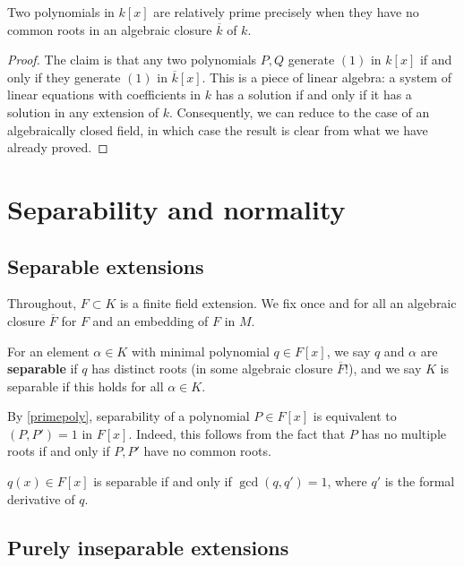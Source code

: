 \begin{proposition} \label{primepoly}
Two polynomials in $k[x]$ are relatively prime precisely when they
have no common roots in an algebraic closure $\overline{k}$ of $k$.
\end{proposition} 
\begin{proof} 
The claim is that any two polynomials $P, Q$ generate $(1)$ in $k[x]$ if and
only if they generate $(1)$ in $\overline{k}[x]$. This is a piece of
linear algebra: a system of linear equations with coefficients in $k$ has
a solution if and only if it has a solution in any extension of $k$.
Consequently, we can reduce to the case of an algebraically closed field, in
which case the result is clear from what we have already proved.
\end{proof} 



\section{Separability and normality}


\subsection{Separable extensions}

Throughout, $F \subset K$ is a finite field extension.  We fix once and for
all an algebraic closure $\overline{F}$ for $F$ and an embedding of $F$ in $M$.


\begin{definition}
For an element $\alpha \in K$ with minimal polynomial $q \in F[x]$, we say
$q$ and $\alpha$ are \textbf{separable} if $q$ has distinct roots (in some
algebraic closure $\overline{F}$!), and we say $K$ is
separable if this holds for all $\alpha \in K$.
\end{definition}



By \cref{primepoly}, separability of a polynomial $P \in F[x]$ is equivalent
to $(P, P') = 1$ in $F[x]$.
Indeed, this follows from the fact that $P$ has no multiple roots if and only if $P, P'$ have no
common roots.

\begin{lemma} $q(x) \in F[x]$ is separable if and only if $\gcd(q, q') = 1$,
where $q'$ is the formal derivative of $q$. 
\label{der_poly}
\end{lemma}




\subsection{Purely inseparable extensions}

